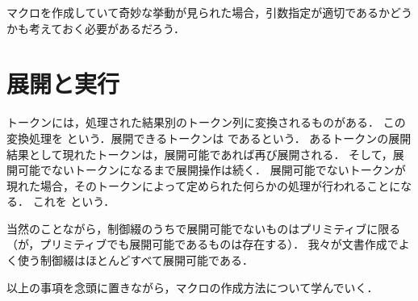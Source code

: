 マクロを作成していて奇妙な挙動が見られた場合，引数指定が適切であるかどうかも考えておく必要があるだろう．


\section{展開と実行} \label{subsec:chap::simplemacro_sec::analysis_expand}

トークンには，処理された結果別のトークン列に変換されるものがある．
この変換処理を%
%
という．展開できるトークンは%
%
であるという．
あるトークンの展開結果として現れたトークンは，展開可能であれば再び展開される．
そして，展開可能でないトークンになるまで展開操作は続く．
展開可能でないトークンが現れた場合，そのトークンによって定められた何らかの処理が行われることになる．
これを%
%
という．

当然のことながら，制御綴のうちで展開可能でないものはプリミティブに限る
（が，プリミティブでも展開可能であるものは存在する）．
我々が文書作成でよく使う制御綴はほとんどすべて展開可能である．

以上の事項を念頭に置きながら，マクロの作成方法について学んでいく．